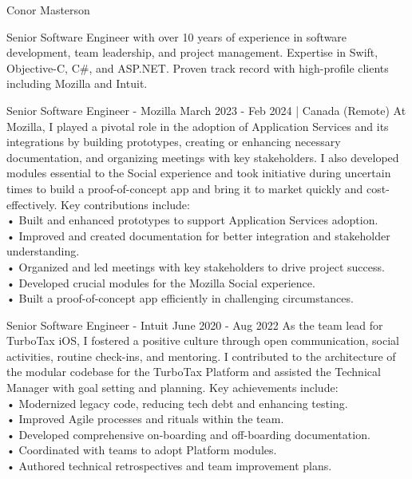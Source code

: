 \documentclass[
	10pt, %
]{FreemanCV}
\begin{document}
	
{\sffamily\Huge\noindent Conor Masterson} %
	
\medskip %
	
{\noindent Senior Software Engineer with over 10 years of experience in software development, team leadership, and project management. Expertise in Swift, Objective-C, C\#, and ASP.NET. Proven track record with high-profile clients including Mozilla and Intuit.}
\medskip

\begin{paracol}{2} %


\jobentry
	{Senior Software Engineer - Mozilla}
    {March 2023 - Feb 2024 | Canada (Remote)}
    {At Mozilla, I played a pivotal role in the adoption of Application Services and its integrations by building prototypes, creating or enhancing necessary documentation, and organizing meetings with key stakeholders. I also developed modules essential to the Social experience and took initiative during uncertain times to build a proof-of-concept app and bring it to market quickly and cost-effectively. Key contributions include:\medskip\\
    • Built and enhanced prototypes to support Application Services adoption.\\
    • Improved and created documentation for better integration and stakeholder understanding.\\
    • Organized and led meetings with key stakeholders to drive project success.\\
    • Developed crucial modules for the Mozilla Social experience.\\
    • Built a proof-of-concept app efficiently in challenging circumstances.}


\jobentry
	{Senior Software Engineer - Intuit}
	{June 2020 - Aug 2022}
	{As the team lead for TurboTax iOS, I fostered a positive culture through open communication, social activities, routine check-ins, and mentoring. I contributed to the architecture of the modular codebase for the TurboTax Platform and assisted the Technical Manager with goal setting and planning. Key achievements include:\medskip\\
    • Modernized legacy code, reducing tech debt and enhancing testing.\\
    • Improved Agile processes and rituals within the team.\\
    • Developed comprehensive on-boarding and off-boarding documentation.\\
    • Coordinated with teams to adopt Platform modules.\\
    • Authored technical retrospectives and team improvement plans.}


\end{paracol}
\end{document}
